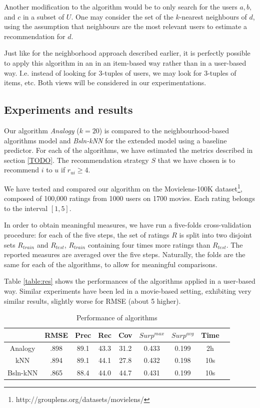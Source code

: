 Another modification to the algorithm would be to only search for the users
$a, b,$ and $c$ in a subset of $U$. One may consider the set of the $k$-nearest
neighbours of $d$, using the assumption that neighbours are the most relevant
users to estimate a recommendation for $d$.

Just like for the neighborhood approach described earlier, it is perfectly
possible to apply this algorithm in an in an item-based way rather
than in a user-based way. I.e. instead of looking for $3$-tuples of users, we
may look for $3$-tuples of items, etc. Both views will be considered in our 
experimentations.


\subsection{Experiments and results}
\label{results}

Our algorithm \textit{Analogy} ($k=20$) is compared to the neighbourhood-based
algorithms model and \textit{Bsln-kNN} for the extended model using a baseline
predictor. For each of the algorithms, we have estimated the metrics described
in section \ref{TODO}.  The recommendation strategy $S$ that we have chosen is
to recommend $i$ to $u$ if $\hat{r}_{ui} \geq 4$.

We have tested and compared our algorithm on the Movielens-100K
dataset\footnote{http://grouplens.org/datasets/movielens/}, composed of 100,000
ratings from 1000 users on 1700 movies. Each rating belongs to the interval
$[1, 5]$.

In order to obtain meaningful measures, we have run a five-folds
cross-validation procedure: for each of the five steps, the set of ratings $R$
is split into two disjoint sets $R_{train}$ and $R_{test}$, $R_{train}$
containing four times more ratings than $R_{test}$. The reported measures are
averaged over the five steps. Naturally, the folds are the same for each of the
algorithms, to allow for meaningful comparisons.

Table \ref{table:res} shows the performances of the algorithms applied in a
user-based way. Similar experiments have been led in a movie-based setting,
exhibiting very similar results, slightly worse for RMSE (about 5\permil
higher).

\begin{table}[ht]
\begin{tabular}{| c || c | c | c | c | c | c | c | c |}
\hline
& RMSE & Prec & Rec & Cov & $Surp^{max}$ & $Surp^{avg}$ & Time \\
\hline
Analogy   & .898 & 89.1 & 43.3 & 31.2 & 0.433 & 0.199 & 2h \\
kNN     & .894 & 89.1 & 44.1 & 27.8 & 0.432 & 0.198 & 10s \\
Bsln-kNN & .865 & 88.4 & 44.0 & 44.7 & 0.431 & 0.199 & 10s \\
\hline
\end{tabular}

\caption{Performance of algorithms}
  \label{Zob}
\end{table}

